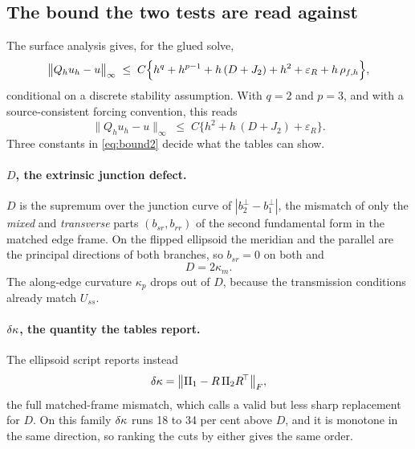 \subsection{The bound the two tests are read against}

The surface analysis \cite{MMC2026b} gives, for the glued solve,
\begin{equation}
  \bigl\| Q_h u_h - u \bigr\|_\infty
  \;\le\; C\Bigl\{ h^{q} + h^{p-1} + h\,(D + J_2) + h^2
          + \varepsilon_R + h\,\rho_{f,h} \Bigr\} ,
  \label{eq:bound}
\end{equation}
conditional on a discrete stability assumption. With $q=2$ and $p=3$,
and with a source-consistent forcing convention, this reads
\begin{equation}
  \bigl\| Q_h u_h - u \bigr\|_\infty
  \;\le\; C\bigl\{ h^2 + h\,(D + J_2) + \varepsilon_R \bigr\} .
  \label{eq:bound2}
\end{equation}
Three constants in \eqref{eq:bound2} decide what the tables can show.

\paragraph{$D$, the extrinsic junction defect.} $D$ is the supremum over
the junction curve of $|b_2^\perp - b_1^\perp|$, the mismatch of only the
\emph{mixed} and \emph{transverse} parts $(b_{sr}, b_{rr})$ of the second
fundamental form in the matched edge frame. On the flipped ellipsoid the
meridian and the parallel are the principal directions of both branches,
so $b_{sr}=0$ on both and
\begin{equation}
  D = 2\kappa_m .
\end{equation}
The along-edge curvature $\kappa_p$ drops out of $D$, because the
transmission conditions already match $U_{ss}$.

\paragraph{$\delta\kappa$, the quantity the tables report.} The ellipsoid script
reports instead
\begin{equation}
  \delta\kappa = \bigl\| \mathrm{II}_1 - R\,\mathrm{II}_2 R^{\!\top} \bigr\|_F ,
\end{equation}
the full matched-frame mismatch, which \cite{MMC2026b} calls a valid but
less sharp replacement for $D$. On this family $\delta\kappa$ runs 18 to 34 per
cent above $D$, and it is monotone in the same direction, so ranking the
cuts by either gives the same order.

